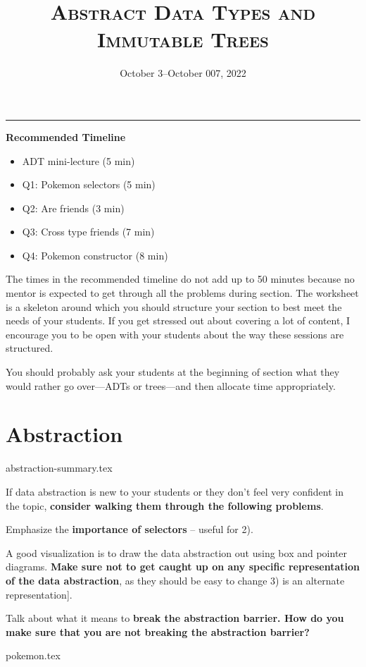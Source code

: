 \documentclass{exam}
\title{\textsc{Abstract Data Types and Immutable Trees}}
\date{October 3--October 007, 2022}
\begin{document}
\maketitle
\rule{\textwidth}{0.15em}
\fontsize{12}{15}\selectfont


\begin{meta}
\textbf{Recommended Timeline}
\begin{itemize}
    \item ADT mini-lecture (5 min)
    \item Q1: Pokemon selectors (5 min)
    \item Q2: Are friends (3 min)
    \item Q3: Cross type friends (7 min)
    \item Q4: Pokemon constructor (8 min)
\end{itemize}
The times in the recommended timeline do not add up to 50 minutes because no mentor
is expected to get through all the problems during section. The worksheet is a skeleton
around which you should structure your section to best meet the needs of your students.
If you get stressed out about covering a lot of content, I encourage you to be open with
your students about the way these sessions are structured.  

You should probably ask your students at the beginning of section what they would rather go
over---ADTs or trees---and then allocate time appropriately. 
\end{meta}


\section{Abstraction}
{abstraction-summary.tex}
\begin{meta}
    If data abstraction is new to your students or they don't feel very confident in the topic, \textbf{consider walking them through the following problems}.
    
    Emphasize the \textbf{importance of selectors} -- useful for 2).
    
    A good visualization is to draw the data abstraction out using box and pointer diagrams. \textbf{Make sure not to get caught up on any specific representation of the data abstraction}, as they should be easy to change 3) is an alternate representation].
    
    Talk about what it means to \textbf{break the abstraction barrier. How do you make sure that you are not breaking the abstraction barrier?}
    \end{meta}
\begin{questions}
    {pokemon.tex}
\end{questions}
\end{document}
